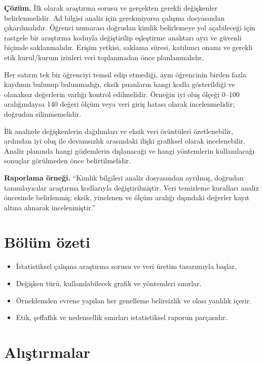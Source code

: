 \textbf{Çözüm.} İlk olarak araştırma sorusu ve gerçekten gerekli değişkenler
belirlenmelidir. Ad bilgisi analiz için gerekmiyorsa çalışma dosyasından
çıkarılmalıdır. Öğrenci numarası doğrudan kimlik belirlemeye yol açabileceği
için rastgele bir araştırma koduyla değiştirilip eşleştirme anahtarı ayrı ve
güvenli biçimde saklanmalıdır. Erişim yetkisi, saklama süresi, katılımcı onamı
ve gerekli etik kurul/kurum izinleri veri toplanmadan önce planlanmalıdır.

Her satırın tek bir öğrenciyi temsil edip etmediği, aynı öğrencinin birden
fazla kaydının bulunup bulunmadığı, eksik puanların hangi kodla gösterildiği
ve olanaksız değerlerin varlığı kontrol edilmelidir. Örneğin iyi oluş ölçeği
0--100 aralığındaysa 140 değeri ölçüm veya veri giriş hatası olarak
incelenmelidir; doğrudan silinmemelidir.

İlk analizde değişkenlerin dağılımları ve eksik veri örüntüleri özetlenebilir,
ardından iyi oluş ile devamsızlık arasındaki ilişki grafiksel olarak
incelenebilir. Analiz planında hangi gözlemlerin dışlanacağı ve hangi
yöntemlerin kullanılacağı sonuçlar görülmeden önce belirtilmelidir.

\textbf{Raporlama örneği.} ``Kimlik bilgileri analiz dosyasından ayrılmış,
doğrudan tanımlayıcılar araştırma kodlarıyla değiştirilmiştir. Veri temizleme
kuralları analiz öncesinde belirlenmiş; eksik, yinelenen ve ölçüm aralığı
dışındaki değerler kayıt altına alınarak incelenmiştir.''





\section{Bölüm özeti}

\begin{itemize}
  \item İstatistiksel çalışma araştırma sorusu ve veri üretim tasarımıyla başlar.
  \item Değişken türü, kullanılabilecek grafik ve yöntemleri sınırlar.
  \item Örneklemden evrene yapılan her genelleme belirsizlik ve olası yanlılık içerir.
  \item Etik, şeffaflık ve nedensellik sınırları istatistiksel raporun parçasıdır.
\end{itemize}

\section*{Alıştırmalar}

